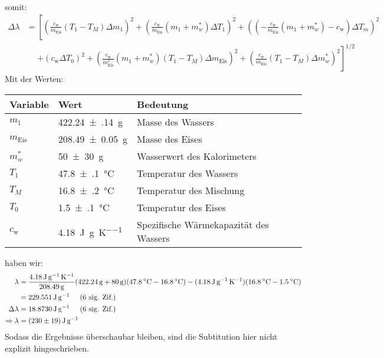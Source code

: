 somit:
\begin{align*}
	\Delta \lambda &= \left[
		\left(\frac{c_\text{w}}{m_\text{Eis}}(T_1 - T_M) \Delta m_1\right)^2 
		+ \left(\frac{c_\text{w}}{m_\text{Eis}}(m_1 + m_w^*) \Delta T_1\right)^2
		+ \left(\left(-\frac{c_\text{w}}{m_\text{Eis}}(m_1 + m_w^*) - c_\text{w}\right) \Delta T_m\right)^2 \right. \\
		&\phantom{=} \left. + \left(c_\text{w} \Delta T_0\right)^2 
		+ \left(\frac{c_\text{w}}{m^2_\text{Eis}}(m_1 + m_w^*)(T_1 -T_M) \Delta m_\text{Eis}\right)^2 
		+ \left(\frac{c_\text{w}}{m_\text{Eis}}(T_1 - T_M) \Delta m_w^*\right)^2
	\right]^{1/2}
\end{align*}
\newpage
Mit der Werten:
\begin{center}
	\begin{tabular}{lll}
		\toprule
		Variable & Wert & Bedeutung \\
		\midrule
		$m_1$ & \SI{422.24(14)}{\gram} & Masse des Wassers \\
		$m_\text{Eis}$ & \SI{208.49(5)}{\gram} & Masse des Eises \\
		$m_w^*$ & \SI{50(30)}{\gram} & Wasserwert des Kalorimeters \\
		$T_1$ & \SI{47.8(1)}{\celsius} & Temperatur des Wassers \\
		$T_M$ & \SI{16.8(2)}{\celsius} & Temperatur des Mischung \\
		$T_0$ & \SI{1.5(1)}{\celsius} & Temperatur des Eises \\
		$c_\text{w}$ & \SI{4.18}{\joule\per\gram\per\kelvin} & Spezifische Wärmekapazität des Wassers\\
		\bottomrule
	\end{tabular}
\end{center}
haben wir:
\begin{align*}
	\lambda &= \frac{\SI{4.18}{\joule\per\gram\per\kelvin}}{\SI{208.49}{\gram}}(\SI{422.24}{\gram} + \SI{80}{\gram})(\SI{47.8}{\celsius} -\SI{16.8}{\celsius}) - (\SI{4.18}{\joule\per\gram\per\kelvin})(\SI{16.8}{\celsius} -\SI{1.5}{\celsius}) \\
	&= \SI{229.551}{\joule\per\gram} \sigfig{6} \\
	\Delta \lambda &= \SI{18.8730}{\joule\per\gram} \sigfig{6} \\
	\Rightarrow \lambda &= \SI{230(19)}{\joule\per\gram}
\end{align*}
Sodass die Ergebnisse überschaubar bleiben, sind die Subtitution hier nicht explizit hingeschrieben.

